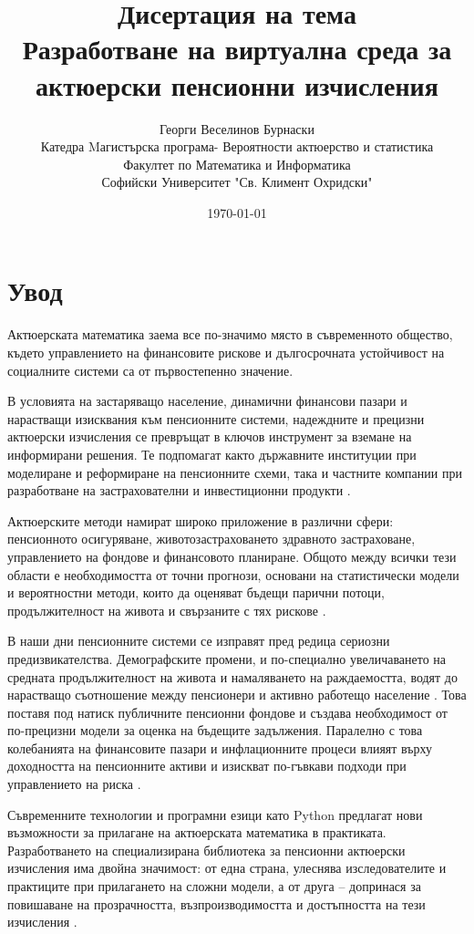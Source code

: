 \documentclass[a4paper,12pt]{article}
\title{\textbf{Дисертация на тема
        \\[0.5em] \large{Разработване на виртуална среда за актюерски пенсионни изчисления}}}
\author{Георги Веселинов Бурнаски
        \\ Катедра Mагистърска програма- Вероятности актюерство и статистика
        \\ Факултет по Математика и Информатика
        \\ Софийски Университет "Св. Климент Охридски"}
\date{\today}
\begin{document}
\maketitle
\newpage
\section{Увод}
Актюерската математика заема все по-значимо място в съвременното общество, където управлението на финансовите рискове и дългосрочната устойчивост на социалните системи са от първостепенно значение.

В условията на застаряващо население, динамични финансови пазари и нарастващи изисквания към пенсионните системи, надеждните и прецизни актюерски изчисления се превръщат в ключов инструмент за вземане на информирани решения. Те подпомагат както държавните институции при моделиране и реформиране на пенсионните схеми, така и частните компании при разработване на застрахователни и инвестиционни продукти \cite{dalriada2023}.

Актюерските методи намират широко приложение в различни сфери:
пенсионното осигуряване, животозастраховането здравното застраховане, управлението на фондове и финансовото планиране. Общото между всички тези области е необходимостта от точни прогнози, основани на статистически модели и вероятностни методи, които да оценяват бъдещи парични потоци, продължителност на живота и свързаните с тях рискове \cite{milliman2022}.

В наши дни пенсионните системи се изправят пред редица сериозни предизвикателства. Демографските промени, и по-специално увеличаването на средната продължителност на живота и намаляването на раждаемостта, водят до нарастващо съотношение между пенсионери и
активно работещо население \cite{bostonfed1999}. Това поставя под натиск публичните пенсионни фондове и създава необходимост от по-прецизни модели за оценка на бъдещите задължения. Паралелно с това колебанията на финансовите пазари и инфлационните процеси влияят върху доходността на пенсионните активи и изискват по-гъвкави подходи при управлението на риска \cite{ncpers2023}.

Съвременните технологии и програмни езици като Python предлагат нови възможности за прилагане на актюерската математика в практиката. Разработването на специализирана библиотека за пенсионни актюерски изчисления има двойна значимост: от една страна, улеснява изследователите и практиците при прилагането на сложни модели, а от друга – допринася за повишаване на прозрачността, възпроизводимостта и достъпността на тези изчисления \cite{lifelib2024, hyperexponential2023}.
\end{document}
